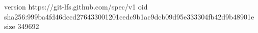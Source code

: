version https://git-lfs.github.com/spec/v1
oid sha256:999ba4fd46dccd276433001201cedc9b1ac9dcb09d95e333304fb42d9b48901e
size 349692
